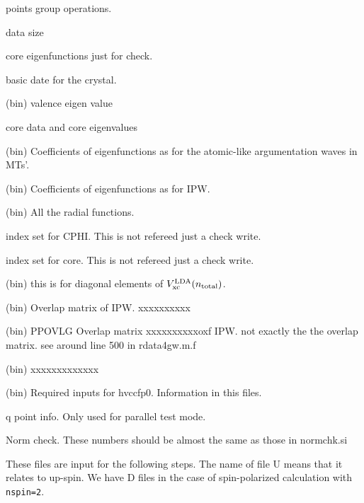 






 points group operations.

\outfiles

  data size

 core eigenfunctions just for check.

 basic date for the crystal.

 (bin) valence eigen value

 core data and core eigenvalues

 (bin) Coefficients of eigenfunctions as for the atomic-like argumentation waves in MTs'.

 (bin) Coefficients of eigenfunctions as for IPW.

 (bin) All the radial functions.

 index set for {\sf CPHI}. This is not refereed just a check write.

 index set for core. This is not refereed just a check write.

 (bin) this is for diagonal elements of $V^{\rm LDA}_{\rm xc}(n_{\rm total})$. 

 (bin) Overlap matrix of IPW. xxxxxxxxxx

 (bin) PPOVLG Overlap matrix xxxxxxxxxxoxf IPW. not exactly the the overlap matrix. see around line 500 in rdata4gw.m.f

 (bin) xxxxxxxxxxxxx

 (bin) Required inputs for hvccfp0. Information in this files. 

 q point info. Only used for parallel test mode.

 Norm check. These numbers should be almost the same as those in normchk.si

\vspace{0.3cm}
\noindent These files are input for the following steps. 
The name of file {U} means that it relates to up-spin.
We have {D} files in the case of spin-polarized calculation with {\tt nspin=2}.



